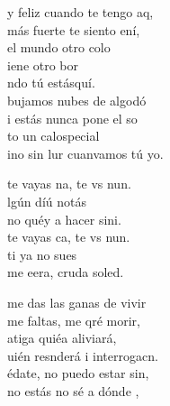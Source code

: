 \begin{cancion}%
	y feliz cuando te tengo aq,\\
	 más fuerte te siento ení,\\
	el mundo  otro colo \\
	iene otro bor \\
	ndo tú estásquí.\\
	\jump
	bujamos nubes de algodó \\
	i estás nunca pone el so \\
	to un calospecial  \\
	ino sin lur cuanvamos tú yo.\jump\\
	\begin{chorus}%
		 te vayas na, te vs nun.\\
		lgún díú notás\\
		no  quéy a hacer sini.\\
		 te vayas ca, te vs nun.\\
		ti ya no  sues\\
		me eera, cruda soled.\jump\\
	\end{chorus}%
	 me das las ganas de vivir\\
	me faltas, me qré morir, \\
	atiga quiéa aliviará,\\
	uién resnderá i interrogacn.\\
	\jump
	édate, no puedo estar sin,\\
	no estás no sé a dónde ,\\

\end{cancion}

